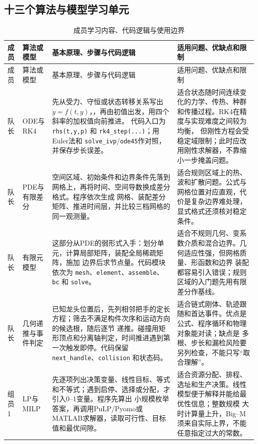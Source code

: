\subsection{十三个算法与模型学习单元}

\setlength{\tabcolsep}{2.5pt}
\small
\begin{longtable}{p{1.25cm}p{2.55cm}p{6.25cm}p{5.45cm}}
\caption{成员学习内容、代码逻辑与使用边界}\label{tab:learning-units}\\
\toprule
成员 & 算法或模型 & 基本原理、步骤与代码逻辑 & 适用问题、优缺点和限制\\
\midrule
\endfirsthead
\toprule
成员 & 算法或模型 & 基本原理、步骤与代码逻辑 & 适用问题、优缺点和限制\\
\midrule
\endhead
\bottomrule
\endfoot

队长 & ODE与RK4
& 先从受力、守恒或状态转移关系写出 $\dot{y}=f(t,y)$，，再由初值出发，用四个斜率的加权值向前推进。
代码入口为 \texttt{rhs(t,y,p)} 和 \texttt{rk4\_step(...)}；用Euler法和
\texttt{solve\_ivp}/\texttt{ode45}作对照，并保存步长误差。
& 适合状态随时间连续变化的力学、传热、种群和传播过程。RK4在精度与实现难度之间较为均衡，
但刚性方程会受稳定域限制；此时应改用刚性求解器，不靠缩小一步掩盖问题。\\

队长 & PDE与有限差分
& 空间区域、初始条件和边界条件先落到网格上，再将时间、空间导数换成差分格式。程序依次生成
网格、装配差分矩阵、推进时间层，并比较三档网格的同一观测量。
& 适合规则区域上的热、波和扩散问题。公式与网格位置对应直观，代价是复杂边界难处理，
显式格式还须核对稳定条件。\\

队长 & 有限元模型
& 这部分从PDE的弱形式入手：划分单元，计算局部矩阵，装配全局稀疏矩阵，施加
边界后求节点量。代码模块依次为 \texttt{mesh}、\texttt{element}、\texttt{assemble}、
\texttt{bc} 和 \texttt{solve}。
& 适合不规则几何、变系数介质和混合边界。几何适应性强，但网格质量、形函数和边界
装配都容易引入错误；规则区域的入门题先用有限差分作基线。\\

队长 & 几何递推与事件判定
& 已知龙头位置后，先列相邻把手的定长方程；筛去不满足构件次序和运动方向的候选根，随后逐节
递推。碰撞用矩形顶点和分离轴判定，时间推进遇到第一次触发即停。代码保留
\texttt{next\_handle}、\texttt{collision} 和状态码。
& 适合链式刚体、轨迹跟随和首达事件。优点是公式、程序循环和物理对象能对读；缺点是
多根、步长和漏检风险要另列检查，不能只写“取合理解”。\\

组员1 & LP与MILP
& 先逐项列出决策变量、线性目标、等式和不等式；遇到启停、选择或分配，才引入0--1变量。程序先算出
小规模枚举答案，再调用PuLP/Pyomo或MATLAB求解器，读取可行性、目标值和最优间隙。
& 适合资源分配、排程、选址和生产决策。线性模型便于解释并能给最优性信息；整数规模
大时计算量上升，Big--M须来自实际上界，不能任意指定过大的常数。\\


\end{longtable}
